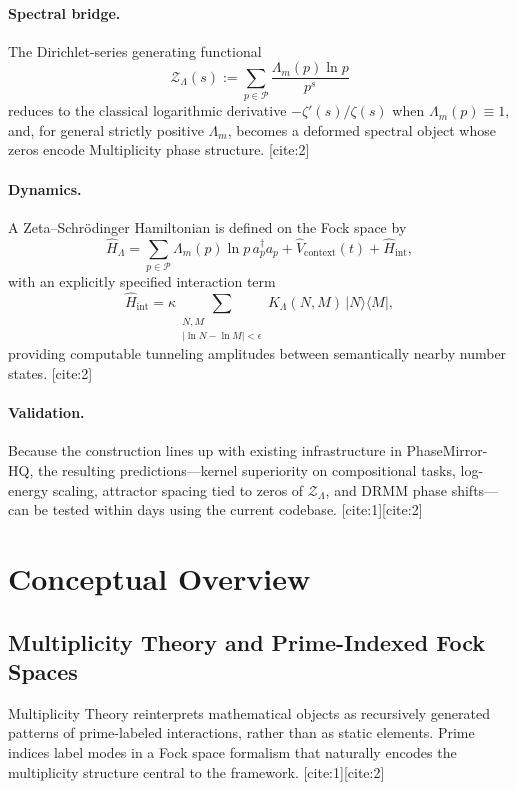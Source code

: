 \documentclass[11pt]{article}
\begin{document}
\paragraph{Spectral bridge.}
The Dirichlet-series generating functional
\[
  \mathcal{Z}_{\Lambda}(s) := \sum_{p \in \mathcal{P}}
    \frac{\Lambda_m(p) \ln p}{p^s}
\]
reduces to the classical logarithmic derivative
$- \zeta'(s) / \zeta(s)$ when $\Lambda_m(p) \equiv 1$, and,
for general strictly positive $\Lambda_m$, becomes a deformed
spectral object whose zeros encode Multiplicity phase structure.
[cite:2]

\paragraph{Dynamics.}
A Zeta--Schr\"odinger Hamiltonian is defined on the Fock space by
\[
  \hat{H}_{\Lambda}
    = \sum_{p \in \mathcal{P}} \Lambda_m(p) \ln p \, a_p^\dagger a_p
      + \hat{V}_{\text{context}}(t)
      + \hat{H}_{\text{int}},
\]
with an explicitly specified interaction term
\[
  \hat{H}_{\text{int}}
    = \kappa \sum_{\substack{N,M \\ |\ln N - \ln M| < \epsilon}}
      K_{\Lambda}(N,M) \, |N\rangle\langle M|,
\]
providing computable tunneling amplitudes between semantically
nearby number states. [cite:2]

\paragraph{Validation.}
Because the construction lines up with existing infrastructure in
PhaseMirror-HQ, the resulting predictions---kernel superiority on
compositional tasks, log-energy scaling, attractor spacing tied to
zeros of $\mathcal{Z}_{\Lambda}$, and DRMM phase shifts---can be
tested within days using the current codebase. [cite:1][cite:2]

\section{Conceptual Overview}

\subsection{Multiplicity Theory and Prime-Indexed Fock Spaces}

Multiplicity Theory reinterprets mathematical objects as recursively
generated patterns of prime-labeled interactions, rather than as
static elements. Prime indices label modes in a Fock space formalism
that naturally encodes the multiplicity structure central to the
framework. [cite:1][cite:2]
\end{document}
